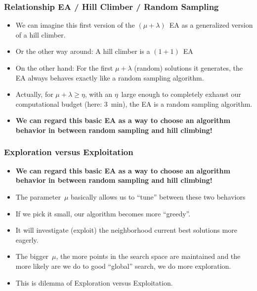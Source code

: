 \documentclass[mathserif]{beamer}%
\begin{document}
%
\begin{frame}[t]%
\frametitle{Relationship EA / Hill Climber / Random Sampling}%
\begin{itemize}%
\item We can imagine this first version of the $(\mu+\lambda)$~EA as a generalized version of a hill climber.%
\item<2-> Or the other way around: A hill climber is a $(1+1)$~EA%
%
\item<6-> On the other hand: For the first $\mu+\lambda$ (random) solutions it generates, the EA always behaves exactly like a random sampling algorithm.%
%
\item<8-> Actually, for $\mu+\lambda\geq \eta$, with an $\eta$~large enough to completely exhaust our computational budget (here: 3~min), the EA \alert{is} a random sampling algorithm.%
\item<9-> \textbf{\alert{We can regard this basic EA as a way to choose an algorithm behavior in between random sampling and hill climbing!}}%
\end{itemize}%
\end{frame}%
%
%
\begin{frame}[t]%
\frametitle{Exploration versus Exploitation}%
\begin{itemize}%
\item \textbf{\alert{We can regard this basic EA as a way to choose an algorithm behavior in between random sampling and hill climbing!}}%
\item<2-> The parameter~$\mu$ basically allows us to ``tune'' between these two behaviors\cite{WWCTL2016GVLSTIOPSOEAP}%
\item<3-> If we pick it small, our algorithm becomes more ``greedy''.%
\item<4-> It will investigate (\alert{exploit}) the neighborhood current best solutions more eagerly.%
\item<7-> The bigger~$\mu$, the more points in the search space are maintained and the more likely are we do to good ``global'' search, we do \alert{more exploration}. %
\item<9-> This is dilemma of \alert{Exploration versus Exploitation}.\cite{ES1998EA,WCT2012EOPABT,WZCN2009WIOD,WGOEB}%
\end{itemize}%
\end{frame}%
%
\end{document}
